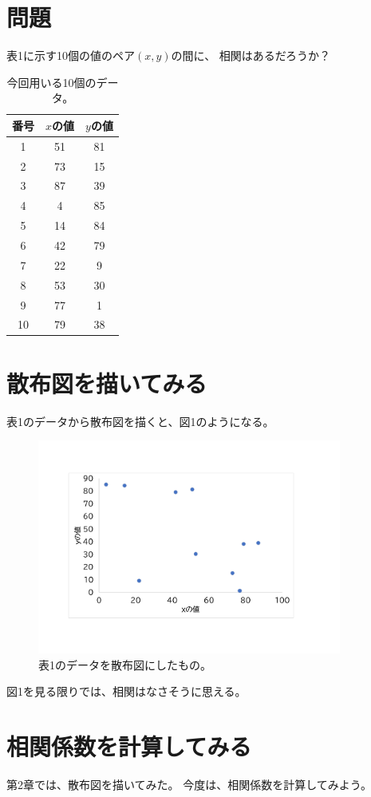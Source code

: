 \documentclass[a4paper, platex, dvipdfmx]{jsarticle}
\begin{document}
\section{問題}
表1に示す10個の値のペア$(x,y)$の間に、
相関はあるだろうか？

\begin{table}[H]
  \centering
  \caption{今回用いる10個のデータ。}
  \begin{tabular}{ccc}
    \hline
    番号 & $x$の値 & $y$の値 \\\hline
    1 & 51 & 81 \\
    2 & 73 & 15 \\
    3 & 87 & 39 \\
    4 & 4 & 85 \\
    5 & 14 & 84 \\
    6 & 42 & 79 \\
    7 & 22 & 9 \\
    8 & 53 & 30 \\
    9 & 77 & 1 \\
    10 & 79 & 38 \\\hline
  \end{tabular}
\end{table}

\section{散布図を描いてみる}
表1のデータから散布図を描くと、図1のようになる。

\begin{figure}[H]
  \centering
  \includegraphics[width=10cm]{cross-ref-scatter.pdf}
  \caption{表1のデータを散布図にしたもの。}
\end{figure}

図1を見る限りでは、相関はなさそうに思える。

\section{相関係数を計算してみる}
第2章では、散布図を描いてみた。
今度は、相関係数を計算してみよう。
\end{document}
